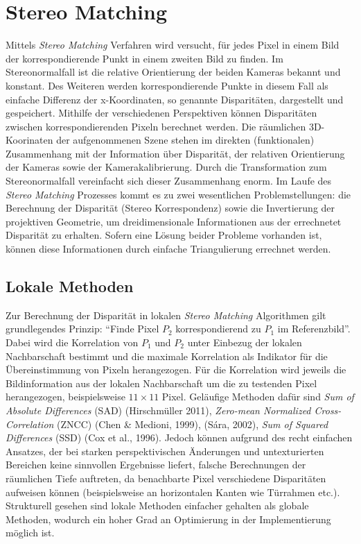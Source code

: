 \section{Stereo Matching}
\label{sec:stereo_matching}
Mittels \emph{Stereo Matching} Verfahren wird versucht, für jedes Pixel in einem Bild der korrespondierende Punkt in einem zweiten Bild zu finden. Im Stereonormalfall ist die relative Orientierung der beiden Kameras bekannt und konstant. Des Weiteren werden korrespondierende Punkte in diesem Fall als einfache Differenz der x-Koordinaten, so genannte Disparitäten, dargestellt und gespeichert. Mithilfe der verschiedenen Perspektiven können Disparitäten zwischen korrespondierenden Pixeln berechnet werden. Die räumlichen 3D-Koorinaten der aufgenommenen Szene stehen im direkten (funktionalen) Zusammenhang mit der Information über Disparität, der  relativen Orientierung der Kameras sowie der Kamerakalibrierung. Durch die Transformation zum Stereonormalfall vereinfacht sich dieser Zusammenhang enorm. Im Laufe des \emph{Stereo Matching} Prozesses kommt es zu zwei wesentlichen Problemstellungen: die Berechnung der Disparität (Stereo Korrespondenz) sowie die Invertierung der projektiven Geometrie, um dreidimensionale Informationen aus der errechnetet Disparität zu erhalten. Sofern eine Lösung beider Probleme vorhanden ist, können diese Informationen durch einfache Triangulierung errechnet werden.

\subsection{Lokale Methoden}
\label{subsec:local_methods}
Zur Berechnung der Disparität in lokalen \emph{Stereo Matching} Algorithmen gilt grundlegendes Prinzip: \enquote{Finde Pixel $P_2$ korrespondierend zu $P_1$ im Referenzbild}. Dabei wird die Korrelation von $P_1$ und $P_2$ unter Einbezug der lokalen Nachbarschaft bestimmt und die maximale Korrelation als Indikator für die Übereinstimmung von Pixeln herangezogen. Für die Korrelation wird jeweils die Bildinformation aus der lokalen Nachbarschaft um die zu testenden Pixel herangezogen, beispielsweise $11\times11$ Pixel. Geläufige Methoden dafür sind \emph{Sum of Absolute Differences} (SAD) (Hirschmüller 2011), \emph{Zero-mean Normalized Cross-Correlation} (ZNCC) (Chen \& Medioni, 1999), (Sára, 2002), \emph{Sum of Squared Differences} (SSD) (Cox et al., 1996). Jedoch können aufgrund des recht einfachen Ansatzes, der bei starken perspektivischen Änderungen und untexturierten Bereichen keine sinnvollen Ergebnisse liefert, falsche Berechnungen der räumlichen Tiefe auftreten, da benachbarte Pixel verschiedene Disparitäten aufweisen können (beispielsweise an horizontalen Kanten wie Türrahmen etc.). Strukturell gesehen sind lokale Methoden einfacher gehalten als globale Methoden, wodurch ein hoher Grad an Optimierung in der Implementierung möglich ist.

